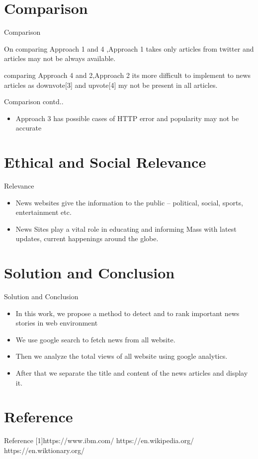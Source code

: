 \documentclass{beamer}
\begin{document}
	\section{Comparison}
	\begin{frame}{Comparison}
	\begin{itemize}
            \item \Large{On comparing Approach 1 and 4 ,Approach 1 takes only articles from twitter and articles may not be always available.      
            \item comparing Approach 4 and 2,Approach 2 its more difficult to implement to news articles as downvote[3] and upvote[4] my not be present in all articles.}
  	    \end{itemize}
  	 \end{frame}
    \begin{frame}{Comparison contd..}
        \begin{itemize}
            \item \Large {Approach 3 has  possible cases of HTTP error and popularity may not be accurate}
        \end{itemize}
	\end{frame}
	\section{Ethical and Social Relevance}
	\begin{frame}{Relevance}
	\begin{itemize}
	    \item \Large{News websites give the information to the public – political, social, sports, entertainment etc.}
	    \item \large{News Sites play a vital role in educating and informing Mass with latest updates, current happenings around the globe.}
	\end{itemize}
	\end{frame}

	\section{Solution and Conclusion}
	
	\begin{frame}{Solution and Conclusion}
	\begin{itemize}
	
	\item \Large In this work, we propose a method to detect and to rank important news stories in web environment
	\item \Largeuse  We use google search to fetch news from all website.
	\item \Largeuse  Then we analyze the total views of all website using google analytics.
	\item \Largeuse  After that we separate the title and content of the news articles and display it.
	\end{itemize}
	\end{frame}
	
	\section{Reference}
	\begin{frame}{Reference}
	    \small[1]https://www.ibm.com/
	    \newline
	    [2]https://en.wikipedia.org/
	    \newline
	    [3]https://en.wiktionary.org/
	     \end{frame}
\end{document}
